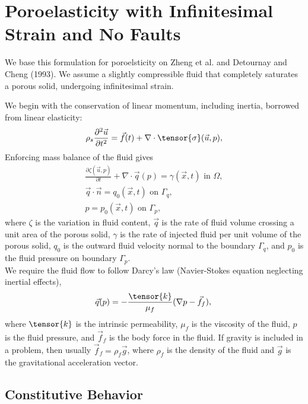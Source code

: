\section{Poroelasticity with Infinitesimal Strain and No Faults}

We base this formulation for poroelsticity on Zheng et al. and
Detournay and Cheng (1993). We assume a slightly compressible fluid
that completely saturates a porous solid, undergoing infinitesimal
strain.

We begin with the conservation of linear momentum, including inertia,
borrowed from linear elasticity:
\begin{equation}
    \rho_s\frac{\partial^2 \vec{u}}{\partial t^2} = \vec{f}(t) + \nabla \cdot \tensor{\sigma}(\vec{u},p),
\end{equation}
Enforcing mass balance of the fluid gives
\begin{gather}
  \frac{\partial \zeta(\vec{u},p)}{\partial t} + \nabla \cdot \vec{q}(p) =
  \gamma(\vec{x},t) \text{ in } \Omega, \\
%
  \vec{q} \cdot \vec{n} = q_0(\vec{x},t) \text{ on }\Gamma_q, \\
%
  p = p_0(\vec{x},t) \text{ on }\Gamma_p,
\end{gather}
where $\zeta$ is the variation in fluid content, $\vec{q}$ is the rate
of fluid volume crossing a unit area of the porous solid, $\gamma$ is
the rate of injected fluid per unit volume of the porous solid, $q_0$
is the outward fluid velocity normal to the boundary $\Gamma_q$, and
$p_0$ is the fluid pressure on boundary $\Gamma_p$.\\

We require the fluid flow to follow Darcy's law (Navier-Stokes
equation neglecting inertial effects),
\begin{equation}
  \vec{q}(p) = -\frac{\tensor{k}}{\mu_{f}}(\nabla p - \vec{f}_f), \\
\end{equation}
where $\tensor{k}$ is the intrinsic permeability, $\mu_f$ is the viscosity of the
fluid, $p$ is the fluid pressure, and $\vec{f}_f$ is the body force
in the fluid. If gravity is included in a problem, then usually
$\vec{f}_f = \rho_f \vec{g}$, where $\rho_f$ is the density of the
fluid and $\vec{g}$ is the gravitational acceleration vector.\\

\subsection{Constitutive Behavior}

